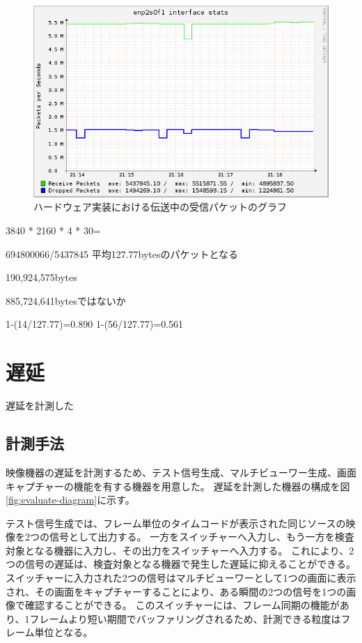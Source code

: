 \begin{figure}[htbp]
  \begin{center}
    \includegraphics[bb=0 0 597 388,width=12cm]{img/enp2s0f1-packets-graph.png}
  \end{center}
  \caption{ハードウェア実装における伝送中の受信パケットのグラフ}
  \label{fig:enp2s0f1-packets-graph}
\end{figure}

3840 * 2160 * 4 * 30=

694800066/5437845
平均127.77bytesのパケットとなる

190,924,575bytes

885,724,641bytesではないか

1-(14/127.77)=0.890
1-(56/127.77)=0.561

\newpage
\section{遅延}

遅延を計測した

\subsection{計測手法}

映像機器の遅延を計測するため、テスト信号生成、マルチビューワー生成、画面キャプチャーの機能を有する機器を用意した。
遅延を計測した機器の構成を図\ref{fig:evaluate-diagram}に示す。

テスト信号生成では、フレーム単位のタイムコードが表示された同じソースの映像を2つの信号として出力する。
一方をスイッチャーへ入力し、もう一方を検査対象となる機器に入力し、その出力をスイッチャーへ入力する。
これにより、2つの信号の遅延は、検査対象となる機器で発生した遅延に抑えることができる。
スイッチャーに入力された2つの信号はマルチビューワーとして1つの画面に表示され、その画面をキャプチャーすることにより、ある瞬間の2つの信号を1つの画像で確認することができる。
このスイッチャーには、フレーム同期の機能があり、1フレームより短い期間でバッファリングされるため、計測できる粒度はフレーム単位となる。

